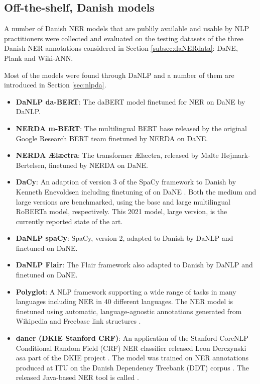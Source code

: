 \documentclass[main.tex]{subfiles}
\begin{document}
\subsection{Off-the-shelf, Danish models}
\label{sec:exidan}
A number of Danish NER models that are publily available and usable by NLP practitioners were collected and evaluated on the testing datasets of the three Danish NER annotations considered in Section \ref{subsec:daNERdata}:
DaNE, Plank and Wiki-ANN.

Most of the models were found through DaNLP \cite{danlp2021} and a number of them are introduced in Section \ref{sec:nlpda}.

\begin{itemize}
    \item \textbf{DaNLP da-BERT}: The daBERT model \cite{botxo2019dabert} finetuned for NER on DaNE by DaNLP.
    \item \textbf{NERDA m-BERT}: The multilingual BERT base released by the original Google Research BERT team \cite{devlin2019bert} finetuned by NERDA \cite{kjeldgaard2020nerda} on DaNE.
    \item \textbf{NERDA Ælæctra}: The transformer Ælæctra, released by Malte Højmark-Bertelsen, \cite{bertelsen2020lctra} finetuned by NERDA on DaNE.
    \item \textbf{DaCy}: An adaption of version 3 of the SpaCy framework \cite{honnibal2020spacy} to Danish by Kenneth Enevoldsen including finetuning of on DaNE \cite{enevoldsen2020dacy}.
        Both the medium and large versions are benchmarked, using the base and large multilingual RoBERTa model, respectively.
        This 2021 model, large version, is the currently reported state of the art.
    \item \textbf{DaNLP spaCy}: SpaCy, version 2, adapted to Danish by DaNLP and finetuned on DaNE.
    \item \textbf{DaNLP Flair}: The Flair framework \cite{akbik2019flair} also adapted to Danish by DaNLP and finetuned on DaNE.
    \item \textbf{Polyglot}: A NLP framework supporting a wide range of tasks in many languages including NER in 40 different languages.
        The NER model is finetuned using automatic, language-agnostic annotations generated from Wikipedia and Freebase link structures \cite{rfou2015polyglot}.
    \item \textbf{daner (DKIE Stanford CRF)}: An application of the Stanford CoreNLP Conditional Random Field (CRF) NER classifier \cite{manning2014corenlp} released Leon Derczynski asa part of the DKIE project \cite{derc2014dkie}.
    The model was trained on NER annotations produced at ITU on the Danish Dependency Treebank (DDT) corpus \cite{kromann2003ddt}.
    The released Java-based NER tool is called \footnotemark.
\end{itemize}
\end{document}
